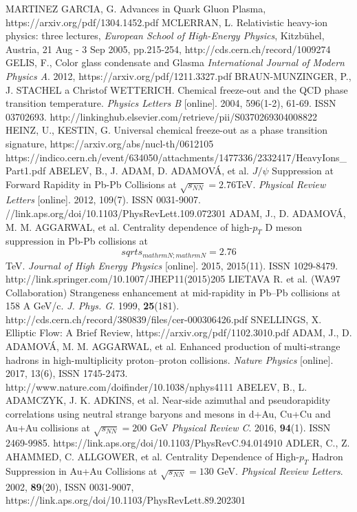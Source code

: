 \documentclass[thesismargins, thesislinespacing]{rnthesis}
\begin{document}
\begin{thebibliography}{}
MARTINEZ GARCIA, G. Advances in Quark Gluon Plasma, https://arxiv.org/pdf/1304.1452.pdf
MCLERRAN, L. Relativistic heavy-ion physics: three lectures, \textit{European School of High-Energy Physics}, Kitzbühel, Austria, 21 Aug - 3 Sep 2005, pp.215-254, http://cds.cern.ch/record/1009274
GELIS, F., Color glass condensate and Glasma \textit{International Journal of Modern Physics A}. 2012, https://arxiv.org/pdf/1211.3327.pdf
BRAUN-MUNZINGER, P., J. STACHEL a Christof WETTERICH. Chemical freeze-out and the QCD phase transition temperature. \textit{Physics Letters B }[online]. 2004, 596(1-2), 61-69. ISSN 03702693. http://linkinghub.elsevier.com/retrieve/pii/S0370269304008822
HEINZ, U., KESTIN, G. Universal chemical freeze-out as a phase transition signature, https://arxiv.org/abs/nucl-th/0612105
https://indico.cern.ch/event/634050/attachments/1477336/2332417/HeavyIons\_Part1.pdf
ABELEV, B., J. ADAM, D. ADAMOVÁ, et al. $J/\psi$ Suppression at Forward Rapidity in Pb-Pb Collisions at $\sqrt{s_{NN}} = 2.76 $TeV. \textit{Physical Review Letters} [online]. 2012, 109(7). ISSN 0031-9007. //link.aps.org/doi/10.1103/PhysRevLett.109.072301
ADAM, J., D. ADAMOVÁ, M. M. AGGARWAL, et al. Centrality dependence of high-$p_{T}$ D meson suppression in Pb-Pb collisions at $$ sqrt{s_{mathrm{N};mathrm{N}}}=2.76 $$ TeV. \textit{Journal of High Energy Physics} [online]. 2015, 2015(11). ISSN 1029-8479. http://link.springer.com/10.1007/JHEP11(2015)205
LIETAVA R.  et al. (WA97 Collaboration) Strangeness enhancement at mid-rapidity in Pb–Pb collisions at 158 A GeV/c. \textit{J. Phys. G}. 1999,  \textbf{25}(181). http://cds.cern.ch/record/380839/files/cer-000306426.pdf 
 SNELLINGS, X.  Elliptic Flow: A Brief Review, https://arxiv.org/pdf/1102.3010.pdf
 ADAM, J., D. ADAMOVÁ, M. M. AGGARWAL, et al. Enhanced production of multi-strange hadrons in high-multiplicity proton–proton collisions. \textit{Nature Physics }[online]. 2017, 13(6), ISSN 1745-2473. http://www.nature.com/doifinder/10.1038/nphys4111
ABELEV, B., L. ADAMCZYK, J. K. ADKINS, et al. Near-side azimuthal and pseudorapidity correlations using neutral strange baryons and mesons in d+Au, Cu+Cu and Au+Au collisions at $\sqrt{s_{NN}}=200$ GeV \textit{Physical Review C}. 2016, \textbf{94}(1). ISSN 2469-9985. https://link.aps.org/doi/10.1103/PhysRevC.94.014910
ADLER, C., Z. AHAMMED, C. ALLGOWER, et al. Centrality Dependence of High-$p_T$ Hadron Suppression in Au+Au Collisions at $\sqrt{s_{NN}} = 130$ GeV. \textit{Physical Review Letters}. 2002, \textbf{89}(20), ISSN 0031-9007, https://link.aps.org/doi/10.1103/PhysRevLett.89.202301

\end{thebibliography}
\end{document}

